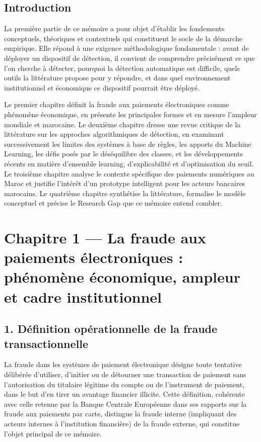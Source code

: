 \section*{Introduction}

La première partie de ce mémoire a pour objet d'établir les fondements conceptuels, théoriques et contextuels qui constituent le socle de la démarche empirique. Elle répond à une exigence méthodologique fondamentale : avant de déployer un dispositif de détection, il convient de comprendre précisément ce que l'on cherche à détecter, pourquoi la détection automatique est difficile, quels outils la littérature propose pour y répondre, et dans quel environnement institutionnel et économique ce dispositif pourrait être déployé.

Le premier chapitre définit la fraude aux paiements électroniques comme phénomène économique, en présente les principales formes et en mesure l'ampleur mondiale et marocaine. Le deuxième chapitre dresse une revue critique de la littérature sur les approches algorithmiques de détection, en examinant successivement les limites des systèmes à base de règles, les apports du Machine Learning, les défis posés par le déséquilibre des classes, et les développements récents en matière d'ensemble learning, d'explicabilité et d'optimisation du seuil. Le troisième chapitre analyse le contexte spécifique des paiements numériques au Maroc et justifie l'intérêt d'un prototype intelligent pour les acteurs bancaires marocains. Le quatrième chapitre synthétise la littérature, formalise le modèle conceptuel et précise le Research Gap que ce mémoire entend combler.

\chapter{Chapitre 1 — La fraude aux paiements électroniques : phénomène économique, ampleur et cadre institutionnel}

\section{1. Définition opérationnelle de la fraude transactionnelle}

La fraude dans les systèmes de paiement électronique désigne toute tentative délibérée d'utiliser, d'initier ou de détourner une transaction de paiement sans l'autorisation du titulaire légitime du compte ou de l'instrument de paiement, dans le but d'en tirer un avantage financier illicite. Cette définition, cohérente avec celle retenue par la Banque Centrale Européenne dans ses rapports sur la fraude aux paiements par carte, distingue la fraude interne (impliquant des acteurs internes à l'institution financière) de la fraude externe, qui constitue l'objet principal de ce mémoire.

